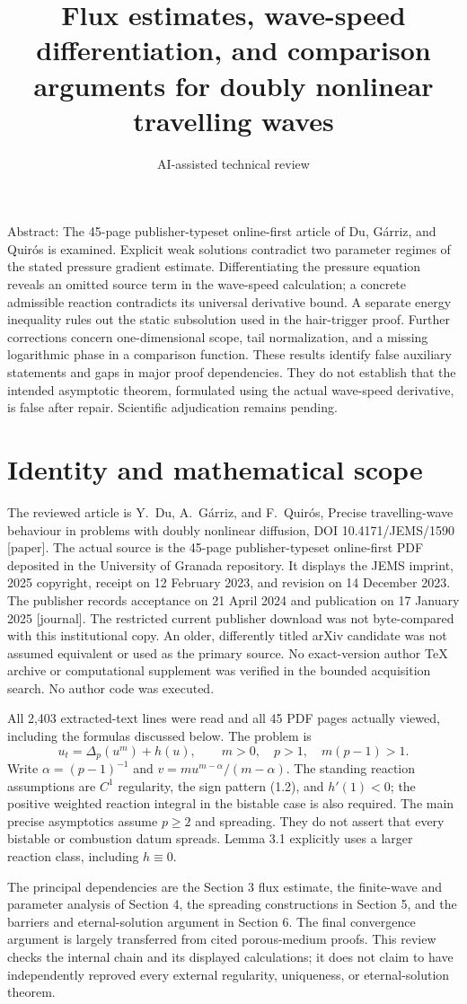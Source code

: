 \documentclass[10pt]{article}
\title{Flux estimates, wave-speed differentiation, and comparison arguments for doubly nonlinear travelling waves}
\author{AI-assisted technical review}
\date{}
\begin{document}
\maketitle
Abstract: The 45-page publisher-typeset online-first article of Du, Gárriz, and Quirós is examined. Explicit weak solutions contradict two parameter regimes of the stated pressure gradient estimate. Differentiating the pressure equation reveals an omitted source term in the wave-speed calculation; a concrete admissible reaction contradicts its universal derivative bound. A separate energy inequality rules out the static subsolution used in the hair-trigger proof. Further corrections concern one-dimensional scope, tail normalization, and a missing logarithmic phase in a comparison function. These results identify false auxiliary statements and gaps in major proof dependencies. They do not establish that the intended asymptotic theorem, formulated using the actual wave-speed derivative, is false after repair. Scientific adjudication remains pending.\par
\section*{Identity and mathematical scope}
The reviewed article is Y. Du, A. Gárriz, and F. Quirós, Precise travelling-wave behaviour in problems with doubly nonlinear diffusion, DOI 10.4171/JEMS/1590 [paper]. The actual source is the 45-page publisher-typeset online-first PDF deposited in the University of Granada repository. It displays the JEMS imprint, 2025 copyright, receipt on 12 February 2023, and revision on 14 December 2023. The publisher records acceptance on 21 April 2024 and publication on 17 January 2025 [journal]. The restricted current publisher download was not byte-compared with this institutional copy. An older, differently titled arXiv candidate was not assumed equivalent or used as the primary source. No exact-version author TeX archive or computational supplement was verified in the bounded acquisition search. No author code was executed.\par
All 2,403 extracted-text lines were read and all 45 PDF pages actually viewed, including the formulas discussed below. The problem is \[u_t=\Delta_p(u^m)+h(u),\qquad
 m>0,\quad p>1,\quad m(p-1)>1.\] Write \(\alpha=(p-1)^{-1}\) and \(v=m u^{m-\alpha}/(m-\alpha)\). The standing reaction assumptions are \(C^1\) regularity, the sign pattern (1.2), and \(h'(1)<0\); the positive weighted reaction integral in the bistable case is also required. The main precise asymptotics assume \(p\geq2\) and spreading. They do not assert that every bistable or combustion datum spreads. Lemma 3.1 explicitly uses a larger reaction class, including \(h\equiv0\).\par
The principal dependencies are the Section 3 flux estimate, the finite-wave and parameter analysis of Section 4, the spreading constructions in Section 5, and the barriers and eternal-solution argument in Section 6. The final convergence argument is largely transferred from cited porous-medium proofs. This review checks the internal chain and its displayed calculations; it does not claim to have independently reproved every external regularity, uniqueness, or eternal-solution theorem.\par
\end{document}
